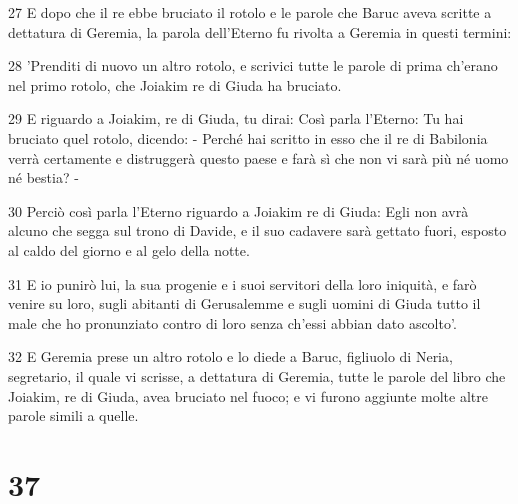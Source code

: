 \par 27 E dopo che il re ebbe bruciato il rotolo e le parole che Baruc aveva scritte a dettatura di Geremia, la parola dell'Eterno fu rivolta a Geremia in questi termini:
\par 28 'Prenditi di nuovo un altro rotolo, e scrivici tutte le parole di prima ch'erano nel primo rotolo, che Joiakim re di Giuda ha bruciato.
\par 29 E riguardo a Joiakim, re di Giuda, tu dirai: Così parla l'Eterno: Tu hai bruciato quel rotolo, dicendo: - Perché hai scritto in esso che il re di Babilonia verrà certamente e distruggerà questo paese e farà sì che non vi sarà più né uomo né bestia? -
\par 30 Perciò così parla l'Eterno riguardo a Joiakim re di Giuda: Egli non avrà alcuno che segga sul trono di Davide, e il suo cadavere sarà gettato fuori, esposto al caldo del giorno e al gelo della notte.
\par 31 E io punirò lui, la sua progenie e i suoi servitori della loro iniquità, e farò venire su loro, sugli abitanti di Gerusalemme e sugli uomini di Giuda tutto il male che ho pronunziato contro di loro senza ch'essi abbian dato ascolto'.
\par 32 E Geremia prese un altro rotolo e lo diede a Baruc, figliuolo di Neria, segretario, il quale vi scrisse, a dettatura di Geremia, tutte le parole del libro che Joiakim, re di Giuda, avea bruciato nel fuoco; e vi furono aggiunte molte altre parole simili a quelle.

\chapter{37}

